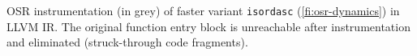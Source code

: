\label{fig:isordascto} OSR instrumentation (in grey) of faster variant {\tt isordasc} (\myfigure\ref{fi:osr-dynamics}) in LLVM IR. The original function entry block is unreachable after instrumentation and eliminated (struck-through code fragments).
